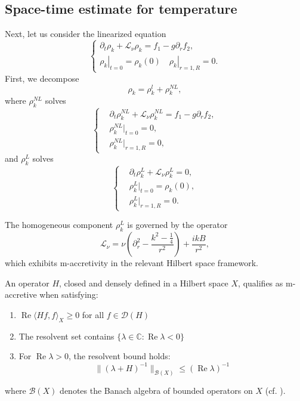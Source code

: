 \documentclass[final, 12pt,reqno]{amsart}
\numberwithin{equation}{section}
\begin{document}
\subsection{Space-time estimate for temperature}\label{sub4.2}
Next, let us consider the linearized equation
\begin{equation}\label{5.4}
    \left\{\begin{array}{l}
    \partial_t \rho_k+\mathcal{L}_\nu \rho_k=f_1-g\partial_rf_2, \\
    \left.\rho_k\right|_{t=0}=\rho_k(0)\left.\quad \rho_k\right|_{r=1, R}=0.
\end{array}\right.
\end{equation}
First, we decompose $$\rho_k=\rho_k^l+\rho_{k}^{NL},$$
where $\rho_k^{NL}$ solves
\begin{equation}\label{5.5}
    \left\{
    \begin{aligned}
        &\partial_t\rho_k^{NL}+\mathcal{L}_\nu \rho_k^{NL}=f_1-g\partial_rf_2,\\
        &\rho_k^{NL}|_{t=0}=0,\\
        &\rho_k^{NL}|_{r=1,R}=0,
    \end{aligned}
    \right.
\end{equation}
and $\rho_k^{L}$ solves
\begin{equation}\label{5.6}
    \left\{
    \begin{aligned}
        &\partial_t\rho_k^{L}+\mathcal{L}_\nu \rho_k^{L}=0,\\
        &\rho_k^{L}|_{t=0}=\rho_k(0),\\
        &\rho_k^{L}|_{r=1,R}=0.
    \end{aligned}
    \right.
\end{equation}



The homogeneous component $\rho_k^{L}$ is governed by the operator
\[
\mathcal{L}_\nu = \nu \left( \partial_r^2 - \frac{k^2 - \frac{1}{4}}{r^2} \right) + \frac{ikB}{r^2},
\]
which exhibits m-accretivity in the relevant Hilbert space framework.

An operator $H$, closed and densely defined in a Hilbert space $X$, qualifies as m-accretive when satisfying:
\begin{enumerate}
    \item $\operatorname{Re} \langle Hf, f \rangle_X \geq 0$ for all $f \in \mathcal{D}(H)$
    \item The resolvent set contains $\{\lambda \in \mathbb{C} : \operatorname{Re} \lambda < 0\}$
    \item For $\operatorname{Re} \lambda > 0$, the resolvent bound holds:
    \[
    \|(\lambda + H)^{-1}\|_{\mathcal{B}(X)} \leq (\operatorname{Re} \lambda)^{-1}
    \]
\end{enumerate}
where $\mathcal{B}(X)$ denotes the Banach algebra of bounded operators on $X$ (cf. \cite{Kato.1966,Pazy.1983}).
\end{document}
